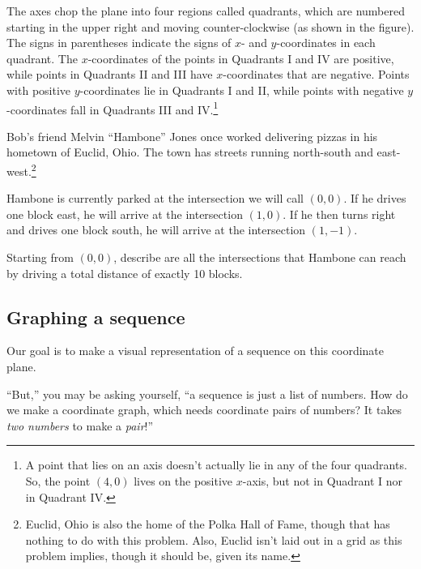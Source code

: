 The axes chop the plane into four regions called \glspl{quadrant}, which are numbered starting in the upper right and moving counter-clockwise (as shown in the figure). The signs in parentheses indicate the signs of $x$- and $y$-coordinates in each quadrant. The $x$-coordinates of the points in Quadrants I and IV are positive, while points in Quadrants II and III have $x$-coordinates that are negative. Points with positive $y$-coordinates lie in Quadrants I and II, while points with negative $y$-coordinates fall in Quadrants III and IV.\footnote{A point that lies on an axis doesn't actually lie in any of the four quadrants. So, the point $(4, 0)$ lives on the positive $x$-axis, but not in Quadrant I nor in Quadrant IV.}

\begin{boxedexplore}
Bob's friend Melvin ``Hambone'' Jones once worked delivering pizzas in his hometown of Euclid, Ohio. The town has streets running north-south and east-west.\footnote{Euclid, Ohio is also the home of the Polka Hall of Fame, though that has nothing to do with this problem. Also, Euclid isn't laid out in a grid as this problem implies, though it should be, given its name.}

Hambone is currently parked at the intersection we will call $(0,0)$. If he drives one block east, he will arrive at the intersection $(1,0)$. If he then turns right and drives one block south, he will arrive at the intersection $(1,-1)$.

Starting from $(0,0)$, describe are all the intersections that Hambone can reach by driving a total distance of exactly 10 blocks.
\end{boxedexplore}

\subsection{Graphing a sequence}

Our goal is to make a visual representation of a sequence on this coordinate plane.

``But,'' you may be asking yourself, ``a sequence is just a list of numbers. How do we make a coordinate graph, which needs coordinate pairs of numbers? It takes \textit{two numbers} to make a \textit{pair}!''


